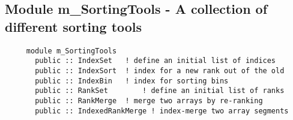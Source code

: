   \subsection{Module m\_SortingTools - A collection of different sorting tools }
%
%  
%  
%  
  
\begin{verbatim} 
     module m_SortingTools
       public :: IndexSet	! define an initial list of indices
       public :: IndexSort	! index for a new rank out of the old
       public :: IndexBin	! index for sorting bins
       public :: RankSet		! define an initial list of ranks
       public :: RankMerge	! merge two arrays by re-ranking
       public :: IndexedRankMerge ! index-merge two array segments
\end{verbatim}
%

